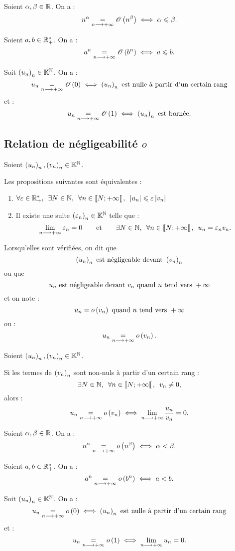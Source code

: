 \begin{ex}
Soient \(\alpha,\beta\in\mathbb{R}\). On a : \[n^{\alpha}\underset{n\longrightarrow+\infty}{=}\mathscr{O}\left(n^\beta\right)\iff\alpha\leqslant\beta.\]

Soient \(a,b\in\mathbb{R}_+^*\). On a : \[a^n\underset{n\longrightarrow+\infty}{=}\mathscr{O}\left(b^n\right)\iff a\leqslant b.\]

Soit \(\left(u_n\right)_n\in\mathbb{K}^{\mathbb{N}}\). On a : \[u_n\underset{n\longrightarrow+\infty}{=}\mathscr{O}\left(0\right)\iff\left(u_n\right)_n\text{ est nulle à partir d'un certain rang}\] et : \[u_n\underset{n\longrightarrow+\infty}{=}\mathscr{O}\left(1\right)\iff\left(u_n\right)_n\text{ est bornée}.\]
\end{ex}

\subsection{Relation de négligeabilité \(o\)}

\begin{defprop}
Soient \(\left(u_n\right)_n,\left(v_n\right)_n\in\mathbb{K}^{\mathbb{N}}\).

Les propositions suivantes sont équivalentes :

\begin{enumerate}
    \item \(\quantifs{\forall\epsilon\in\Rps;\exists N\in\N;\forall n\in\interventierie{N}{\pinf}}\abs{u_n}\leq\epsilon\abs{v_n}\) \\
    \item Il existe une suite \(\left(\varepsilon_n\right)_n\in\mathbb{K}^{\mathbb{N}}\) telle que : \[\lim_{n\to\pinf}\epsilon_n=0\qquad\text{et}\qquad\quantifs{\exists N\in\N;\forall n\in\interventierie{N}{\pinf}}u_n=\epsilon_nv_n.\]
\end{enumerate}

Lorsqu'elles sont vérifiées, on dit que \[\left(u_n\right)_n\text{ est négligeable devant }\left(v_n\right)_n\] ou que \[u_n\text{ est négligeable devant }v_n\text{ quand }n\text{ tend vers }+\infty\] et on note : \[u_n=o\left(v_n\right)\text{ quand }n\text{ tend vers }+\infty\] ou : \[u_n\underset{n\longrightarrow+\infty}{=}o\left(v_n\right).\]
\end{defprop}

\begin{prop}
Soient \(\left(u_n\right)_n,\left(v_n\right)_n\in\mathbb{K}^{\mathbb{N}}\).

Si les termes de \(\left(v_n\right)_n\) sont non-nuls à partir d'un certain rang : \[\quantifs{\exists N\in\N;\forall n\in\interventierie{N}{\pinf}}v_n\not=0,\] alors : \[u_n\underset{n\longrightarrow+\infty}{=}o\left(v_n\right)\iff\lim_{n\longrightarrow+\infty}\dfrac{u_n}{v_n}=0.\]
\end{prop}

\begin{ex}
Soient \(\alpha,\beta\in\mathbb{R}\). On a : \[n^\alpha\underset{n\longrightarrow+\infty}{=}o\left(n^\beta\right)\iff\alpha<\beta.\]

Soient \(a,b\in\mathbb{R}_+^*\). On a : \[a^n\underset{n\longrightarrow+\infty}{=}o\left(b^n\right)\iff a<b.\]

Soit \(\left(u_n\right)_n\in\mathbb{K}^{\mathbb{N}}\). On a : \[u_n\underset{n\longrightarrow+\infty}{=}o\left(0\right)\iff\left(u_n\right)_n\text{ est nulle à partir d'un certain rang}\] et : \[u_n\underset{n\longrightarrow+\infty}{=}o\left(1\right)\iff\lim_{n\longrightarrow+\infty}u_n=0.\]
\end{ex}

